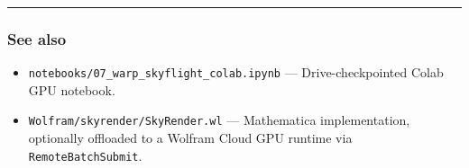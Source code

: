 \documentclass[11pt]{article}
\begin{document}
\bigskip\hrule\medskip
\subsubsection*{See also}
\begin{itemize}[leftmargin=*]
  \item \texttt{notebooks/07\_warp\_skyflight\_colab.ipynb} — Drive-checkpointed Colab GPU notebook.
  \item \texttt{Wolfram/skyrender/SkyRender.wl} — Mathematica implementation, optionally offloaded to a Wolfram Cloud GPU runtime via \texttt{RemoteBatchSubmit}.
\end{itemize}
\end{document}
